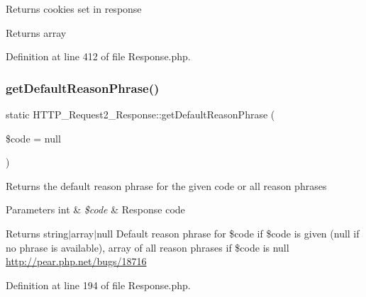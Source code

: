 Returns cookies set in response

\begin{DoxyReturn}{Returns}
array 
\end{DoxyReturn}


Definition at line 412 of file Response.\+php.

\mbox{\label{classHTTP__Request2__Response_ae6a45aaf10437d67b4710d61702d9819}} 
\subsubsection{\texorpdfstring{get\+Default\+Reason\+Phrase()}{getDefaultReasonPhrase()}}
{\footnotesize\ttfamily static H\+T\+T\+P\+\_\+\+Request2\+\_\+\+Response\+::get\+Default\+Reason\+Phrase (\begin{DoxyParamCaption}\item[{}]{\$code = {\ttfamily null} }\end{DoxyParamCaption})\hspace{0.3cm}{\ttfamily [static]}}

Returns the default reason phrase for the given code or all reason phrases


\begin{DoxyParams}[1]{Parameters}
int & {\em \$code} & Response code\\
\hline
\end{DoxyParams}
\begin{DoxyReturn}{Returns}
string$\vert$array$\vert$null Default reason phrase for \$code if \$code is given (null if no phrase is available), array of all reason phrases if \$code is null \hyperlink{}{http\+://pear.\+php.\+net/bugs/18716}
\end{DoxyReturn}


Definition at line 194 of file Response.\+php.

\mbox{\label{classHTTP__Request2__Response_ac62d21f48b31db496403da74ec9a9635}} 
